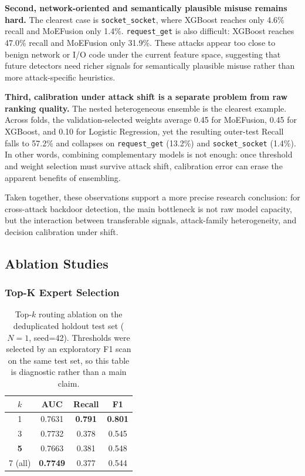 ﻿\documentclass[sigconf,review,anonymous]{acmart}
\newcommand{\sys}{MoEFusion}
\begin{document}
\textbf{Second, network-oriented and semantically plausible misuse remains hard.}
The clearest case is \texttt{socket\_socket}, where XGBoost reaches only 4.6\%
recall and \sys{} only 1.4\%.
\texttt{request\_get} is also difficult: XGBoost reaches 47.0\% recall and
\sys{} only 31.9\%.
These attacks appear too close to benign network or I/O code under the current
feature space, suggesting that future detectors need richer signals for
semantically plausible misuse rather than more attack-specific heuristics.

\textbf{Third, calibration under attack shift is a separate problem from raw
ranking quality.}
The nested heterogeneous ensemble is the clearest example.
Across folds, the validation-selected weights average 0.45 for \sys{}, 0.45 for
XGBoost, and 0.10 for Logistic Regression, yet the resulting outer-test Recall
falls to 57.2\% and collapses on \texttt{request\_get} (13.2\%) and
\texttt{socket\_socket} (1.4\%).
In other words, combining complementary models is not enough: once threshold and
weight selection must survive attack shift, calibration error can erase the
apparent benefits of ensembling.

Taken together, these observations support a more precise research conclusion:
for cross-attack backdoor detection, the main bottleneck is not raw model
capacity, but the interaction between transferable signals, attack-family
heterogeneity, and decision calibration under shift.

\subsection{Ablation Studies}
\label{sec:exp:ablation}

\subsubsection{Top-K Expert Selection}

\begin{table}[t]
\centering
\caption{Top-$k$ routing ablation on the deduplicated holdout test set
($N{=}1$, seed=42). Thresholds were selected by an exploratory F1 scan on the
same test set, so this table is diagnostic rather than a main claim.}
\label{tab:topk}
\small
\begin{tabular}{cccc}
\toprule
$k$ & AUC & Recall & F1 \\
\midrule
1 & 0.7631 & \textbf{0.791} & \textbf{0.801} \\
3 & 0.7732 & 0.378 & 0.545 \\
\textbf{5} & 0.7663 & 0.381 & 0.548 \\
7 (all) & \textbf{0.7749} & 0.377 & 0.544 \\
\bottomrule
\end{tabular}
\end{table}
\end{document}
